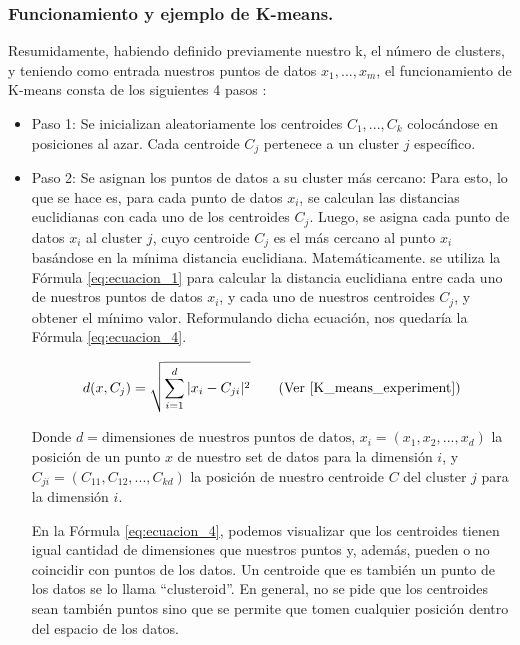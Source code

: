 \documentclass[12pt,a4paper]{article}
\begin{document}
\begin{sloppypar}
\subsubsection{Funcionamiento y ejemplo de K-means.}\label{K_means_funcionamiento}

Resumidamente, habiendo definido previamente nuestro k, el número de clusters, y teniendo como entrada nuestros puntos de datos $x_{1},...,x_{m}$, el funcionamiento de K-means consta de los siguientes 4 pasos \cite{K_means_review}:

\begin{itemize}
\item Paso 1: Se inicializan aleatoriamente los centroides $C_{1},...,C_{k}$ colocándose en posiciones al azar. Cada centroide $C_{j}$ pertenece a un cluster $j$ específico. 
\item Paso 2: Se asignan los puntos de datos a su cluster más cercano: Para esto, lo que se hace es, para cada punto de datos $x_{i}$, se calculan las distancias euclidianas con cada uno de los centroides $C_{j}$. Luego, se asigna cada punto de datos $x_{i}$ al cluster $j$, cuyo centroide $C_{j}$ es el más cercano al punto $x_{i}$ basándose en la mínima distancia euclidiana. Matemáticamente. se utiliza la Fórmula \ref{eq:ecuacion_1} para calcular la distancia euclidiana entre cada uno de nuestros puntos de datos $x_{i}$, y cada uno de nuestros centroides $C_{j}$, y obtener el mínimo valor. Reformulando dicha ecuación, nos quedaría la Fórmula \ref{eq:ecuacion_4}.   

\begin{equation}\label{eq:ecuacion_4}
d(x,C_{j})=\sqrt{\sum_{i=1}^{d}|x_{i}-C_{ji}|^2}  \qquad  \text{(Ver \cite{K_means_experiment})}
\end{equation}

Donde $d = \text{dimensiones de nuestros puntos de datos}$, $x_{i} = (x_{1},x_{2},...,x_{d})$ la posición de un punto $x$ de nuestro set de datos para la dimensión $i$, y $C_{ji} = (C_{11},C_{12},...,C_{kd})$ la posición de nuestro centroide $C$ del cluster $j$ para la dimensión $i$.
            
En la Fórmula \ref{eq:ecuacion_4}, podemos visualizar que los centroides tienen igual cantidad de dimensiones que nuestros puntos y, además, pueden o no coincidir con puntos de los datos. Un centroide que es también un punto de los datos se lo llama “clusteroid”. En general, no se pide que los centroides sean también puntos sino que se permite que tomen cualquier posición dentro del espacio de los datos.


\end{itemize}
\end{sloppypar}
\end{document}
